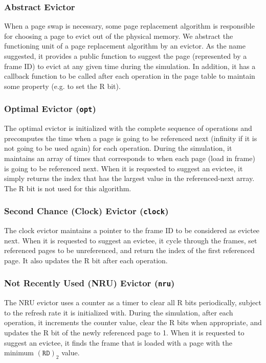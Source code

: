 \documentclass[letterpaper]{article}
\begin{document}
\subsubsection{Abstract Evictor}\label{sec:evictor}
When a page swap is necessary, some page replacement algorithm is responsible for choosing a page to evict out of the physical memory. We abstract the functioning unit of a page replacement algorithm by an evictor. As the name suggested, it provides a public function to suggest the page (represented by a frame ID) to evict at any given time during the simulation. In addition, it has a callback function to be called after each operation in the page table to maintain some property (e.g. to set the R bit).
\subsubsection{Optimal Evictor (\texttt{opt})}
The optimal evictor is initialized with the complete sequence of operations and precomputes the time when a page is going to be referenced next (infinity if it is not going to be used again) for each operation. During the simulation, it maintains an array of times that corresponds to when each page (load in frame) is going to be referenced next. When it is requested to suggest an evictee, it simply returns the index that has the largest value in the referenced-next array. The R bit is not used for this algorithm.
\subsubsection{Second Chance (Clock) Evictor (\texttt{clock})}
The clock evictor maintains a pointer to the frame ID to be considered as evictee next. When it is requested to suggest an evictee, it cycle through the frames, set referenced pages to be unreferenced, and return the index of the first referenced page. It also updates the R bit after each operation.
\subsubsection{Not Recently Used (NRU) Evictor (\texttt{nru})}
The NRU evictor uses a counter as a timer to clear all R bits periodically, subject to the refresh rate it is initialized with. During the simulation, after each operation, it increments the counter value, clear the R bits when appropriate, and updates the R bit of the newly referenced page to 1. When it is requested to suggest an evictee, it finds the frame that is loaded with a page with the minimum $(\texttt{RD})_2$ value.
\end{document}
